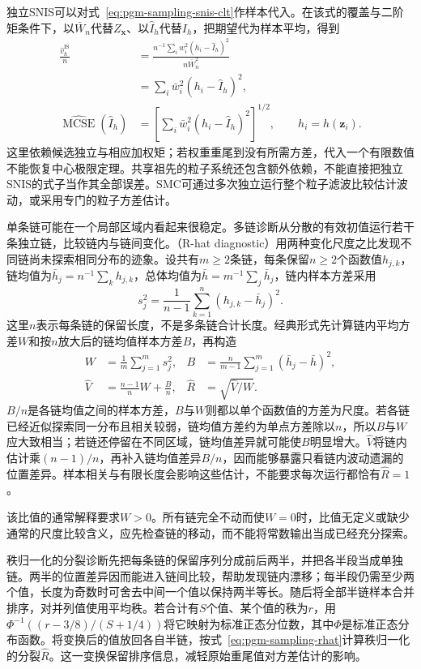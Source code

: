 独立SNIS可以对式~\eqref{eq:pgm-sampling-snis-clt}作样本代入。在该式的覆盖与二阶矩条件下，以$\bar W_n$代替$Z_{\bm x}$、以$\widehat I_h$代替$I_h$，把期望代为样本平均，得到
\[
  \begin{aligned}
    \frac{\widehat v_h^{\mathrm{IS}}}{n}
       &=\frac{n^{-1}\sum_iw_i^2(h_i-\widehat I_h)^2}
               {n\bar W_n^2}\\
       &=\sum_i\bar w_i^2(h_i-\widehat I_h)^2,\\
    \widehat{\operatorname{MCSE}}(\widehat I_h)
       &=\left[\sum_i\bar w_i^2(h_i-\widehat I_h)^2\right]^{1/2},
       \qquad h_i=h(\bm z_i).
  \end{aligned}
\]
这里依赖候选独立与相应加权矩；若权重重尾到没有所需方差，代入一个有限数值不能恢复中心极限定理。共享祖先的粒子系统还包含额外依赖，不能直接把独立SNIS的式子当作其全部误差。SMC可通过多次独立运行整个粒子滤波比较估计波动，或采用专门的粒子方差估计。

单条链可能在一个局部区域内看起来很稳定。多链诊断从分散的有效初值运行若干条独立链，比较链内与链间变化。（R-hat diagnostic）用两种变化尺度之比发现不同链尚未探索相同分布的迹象。设共有$m\geq2$条链，每条保留$n\geq2$个函数值$h_{j,k}$，链均值为$\bar h_j=n^{-1}\sum_kh_{j,k}$，总体均值为$\bar h=m^{-1}\sum_j\bar h_j$，链内样本方差采用
\[
  s_j^2=\frac1{n-1}\sum_{k=1}^n(h_{j,k}-\bar h_j)^2.
\]
这里$n$表示每条链的保留长度，不是多条链合计长度。经典形式先计算链内平均方差$W$和按$n$放大后的链均值样本方差$B$，再构造
\begin{equation}
  \begin{aligned}
    W&=\frac1m\sum_{j=1}^{m}s_j^2,&
    B&=\frac{n}{m-1}\sum_{j=1}^{m}(\bar h_j-\bar h)^2,\\
    \widehat V&=\frac{n-1}{n}W+\frac{B}{n},&
    \widehat R&=\sqrt{\widehat V/W}.
  \end{aligned}
  \label{eq:pgm-sampling-rhat}
\end{equation}
$B/n$是各链均值之间的样本方差，$B$与$W$则都以单个函数值的方差为尺度。若各链已经近似探索同一分布且相关较弱，链均值方差约为单点方差除以$n$，所以$B$与$W$应大致相当；若链还停留在不同区域，链均值差异就可能使$B$明显增大。$\widehat V$将链内估计乘$(n-1)/n$，再补入链均值差异$B/n$，因而能够暴露只看链内波动遗漏的位置差异。样本相关与有限长度会影响这些估计，不能要求每次运行都恰有$\widehat R=1$。

该比值的通常解释要求$W>0$。所有链完全不动而使$W=0$时，比值无定义或缺少通常的尺度比较含义，应先检查链的移动，而不能将常数输出当成已经充分探索。

秩归一化的分裂诊断先把每条链的保留序列分成前后两半，并把各半段当成单独链。两半的位置差异因而能进入链间比较，帮助发现链内漂移；每半段仍需至少两个值，长度为奇数时可舍去中间一个值以保持两半等长。随后将全部半链样本合并排序，对并列值使用平均秩。若合计有$S$个值、某个值的秩为$r$，用$\Phi^{-1}((r-3/8)/(S+1/4))$将它映射为标准正态分位数，其中$\Phi$是标准正态分布函数。将变换后的值放回各自半链，按式~\eqref{eq:pgm-sampling-rhat}计算秩归一化的分裂$\widehat R$。这一变换保留排序信息，减轻原始重尾值对方差估计的影响。

